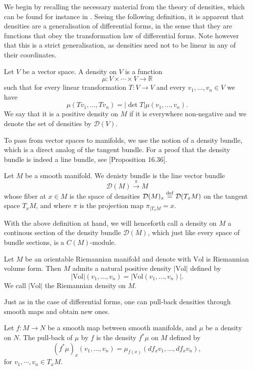 \documentclass{report}
\begin{document}
We begin by recalling the necessary material from the theory of densities, which can be found for instance in \cite{lee2012smooth}. 
Seeing the following definition, it is apparent that densities are a generalisation of differential forms, in the sense that they are functions that obey the transformation law of differential forms.
Note however that this is a strict generalisation, as densities need not to be linear in any of their coordinates. 
\begin{definition}
    Let $V$ be a vector space.
    A density on $V$ is a function
    \[
    \mu: V\times \cdots \times V \to \mathbb R
    \]
    such that for every linear transformation $T: V \to V$ and every $v_1, \ldots, v_n \in V$ we have
    \[ 
    \mu(Tv_1, \ldots, Tv_n) = |\det T| \mu(v_1, \ldots, v_n).
    \]
    We say that it is a positive density on $M$ if it is everywhere non-negative and we denote the set of densities by $\mathcal D(V)$.
\end{definition}
To pass from vector spaces to manifolds, we use the notion of a density bundle, which is a direct analog of the tangent bundle.
For a proof that the density bundle is indeed a line bundle, see \cite{lee2012smooth}[Proposition 16.36].
\begin{definition}
    Let $M$ be a smooth manifold.
    We denisty bundle is the line vector bundle $$\mathcal D(M) \overset{\pi}{\to} M$$ whose fiber at $x \in M$ is the space of densities $\mathcal D(M)_x \overset{\mathrm{def}}{=} \mathcal D(T_x M)$ on the tangent space $T_x M$, and where $\pi$ is the projection map $\pi_{|T_x M} = x$.
\end{definition}
With the above definition at hand, we will henceforth call a density on $M$ a continous section of the density bundle $\mathcal D(M)$, which 
just like every space of bundle sections, is a $C(M)$-module.
\begin{example}
    Let $M$ be an orientable Riemannian manifold and denote with $\mathrm{Vol}$ is Riemannian volume form.
    Then $M$ admits a natural positive density $|\mathrm{Vol}|$ defined by
    \[
    |\mathrm{Vol}|(v_1, \ldots, v_n) = |\mathrm{Vol}(v_1, \ldots, v_n)|.
    \]
    We call $|\mathrm{Vol}|$ the Riemannian density on $M$.
\end{example}

Just as in the case of differential forms, one can pull-back densities through smooth maps and obtain new ones.
\begin{definition}
    Let $f: M \to N$ be a smooth map between smooth manifolds, and $\mu$ be a density on $N$.
    The pull-back of $\mu$ by $f$ is the density $f^*\mu$ on $M$ defined by
    \[
    (f^*\mu)_x(v_1, \ldots, v_n) = \mu_{f(x)}(df_x v_1, \ldots, df_x v_n),
    \]
    for $v_1, \cdots, v_n \in T_x M$.
\end{definition}
\end{document}
